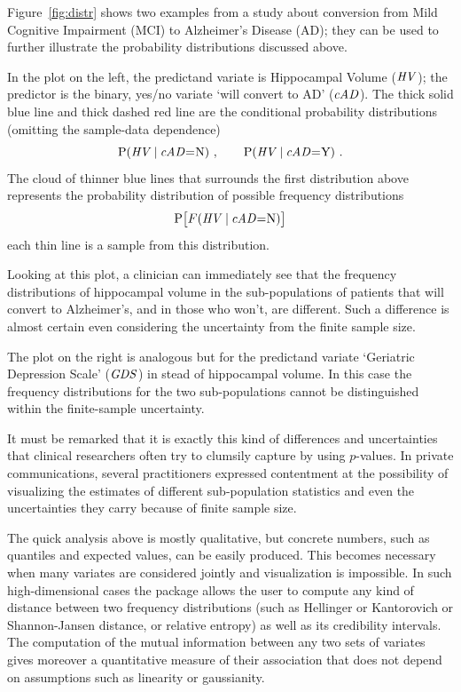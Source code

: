 Figure~\ref{fig:distr} shows two examples from a study \citep{portamanaetal2023b} about conversion from Mild Cognitive Impairment (MCI) to Alzheimer's Disease (AD); they can be used to further illustrate the probability distributions discussed above.

In the plot on the left, the predictand variate is Hippocampal Volume ($\mathit{HV}$); the predictor is the binary, yes/no variate `will convert to AD' ($\mathit{cAD}$). The thick solid blue line and thick dashed red line are the conditional probability distributions (omitting the sample-data dependence)
\begin{equation*}
  \P( \HV \| \cAD \mo \yn)\ ,\qquad
  \P( \HV \| \cAD \mo \yy) \ .
\end{equation*}
The cloud of thinner blue lines that surrounds the first distribution above  represents the probability distribution of possible frequency distributions
\begin{equation*}
  \P\bigl[ \yF(\HV \| \cAD \mo \yn)\bigr]
\end{equation*}
each thin line is a sample from this distribution.

Looking at this plot, a clinician can immediately see that the frequency distributions of hippocampal volume in the sub-populations of patients that will convert to Alzheimer's, and in those who won't, are different. Such a difference is almost certain even considering the uncertainty from the finite sample size.

The plot on the right is analogous but for the predictand variate `Geriatric Depression Scale' ($\mathit{GDS}$) in stead of hippocampal volume. In this case the frequency distributions for the two sub-populations cannot be distinguished within the finite-sample uncertainty.

It must be remarked that it is exactly this kind of differences and uncertainties that clinical researchers often try to clumsily capture by using $p$-values. In private communications, several practitioners expressed contentment at the possibility of visualizing the estimates of different sub-population statistics and even the uncertainties they carry because of finite sample size.

The quick analysis above is mostly qualitative, but concrete numbers, such as quantiles and expected values, can be easily produced. This becomes necessary when many variates are considered jointly and visualization is impossible. In such high-dimensional cases the package allows the user to compute any kind of distance between two frequency distributions (such as Hellinger or Kantorovich or Shannon-Jansen distance, or relative entropy) as well as its credibility intervals. The computation of the mutual information between any two sets of variates gives moreover a quantitative measure of their association that does not depend on assumptions such as linearity or gaussianity.

